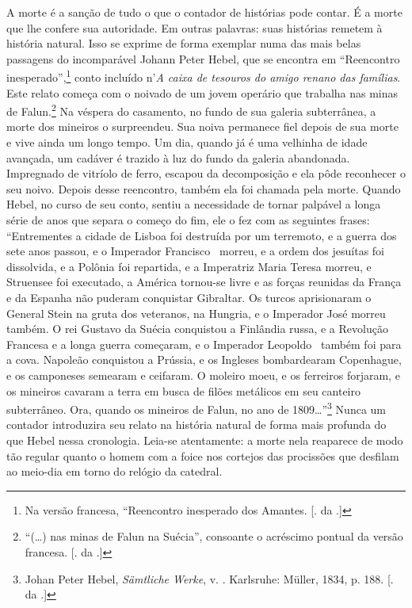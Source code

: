 A morte é a sanção de tudo o que o contador de histórias pode contar. É
a morte que lhe confere sua autoridade. Em outras palavras: suas
histórias remetem à história natural. Isso se exprime de forma exemplar
numa das mais belas passagens do incomparável Johann Peter Hebel, que se
encontra em ``Reencontro inesperado'',\footnote{Na versão francesa,
  ``Reencontro inesperado dos Amantes. [. da .]} conto
incluído n'\emph{A caixa de tesouros do amigo renano das famílias}. Este
relato começa com o noivado de um jovem operário que trabalha nas minas
de Falun.\footnote{``(\ldots{}) nas minas de Falun na Suécia'', consoante o
  acréscimo pontual da versão francesa. [. da .]} Na véspera do
casamento, no fundo de sua galeria subterrânea, a morte dos mineiros o
surpreendeu. Sua noiva permanece fiel depois de sua morte e vive ainda
um longo tempo. Um dia, quando já é uma velhinha de idade avançada, um
cadáver é trazido à luz do fundo da galeria abandonada. Impregnado de
vitríolo de ferro, escapou da decomposição e ela pôde reconhecer o seu
noivo. Depois desse reencontro, também ela foi chamada pela morte.
Quando Hebel, no curso de seu conto, sentiu a necessidade de tornar
palpável a longa série de anos que separa o começo do fim, ele o fez com
as seguintes frases: ``Entrementes a cidade de Lisboa foi destruída por
um terremoto, e a guerra dos sete anos passou, e o Imperador Francisco~
morreu, e a ordem dos jesuítas foi dissolvida, e a Polônia foi
repartida, e a Imperatriz Maria Teresa morreu, e Struensee foi
executado, a América tornou-se livre e as forças reunidas da França e da
Espanha não puderam conquistar Gibraltar. Os turcos aprisionaram o
General Stein na gruta dos veteranos, na Hungria, e o Imperador José
morreu também. O rei Gustavo da Suécia conquistou a Finlândia russa, e a
Revolução Francesa e a longa guerra começaram, e o Imperador Leopoldo~
também foi para a cova. Napoleão conquistou a Prússia, e os Ingleses
bombardearam Copenhague, e os camponeses semearam e ceifaram. O moleiro
moeu, e os ferreiros forjaram, e os mineiros cavaram a terra em busca de
filões metálicos em seu canteiro subterrâneo. Ora, quando os mineiros de
Falun, no ano de 1809\ldots{}''\footnote{Johan Peter Hebel, \emph{Sämtliche
  Werke}, v. . Karlsruhe: Müller, 1834, p. 188. [. da .]}
Nunca um contador introduzira seu relato na história natural de forma
mais profunda do que Hebel nessa cronologia. Leia-se atentamente: a
morte nela reaparece de modo tão regular quanto o homem com a foice nos
cortejos das procissões que desfilam ao meio-dia em torno do relógio da
catedral.

